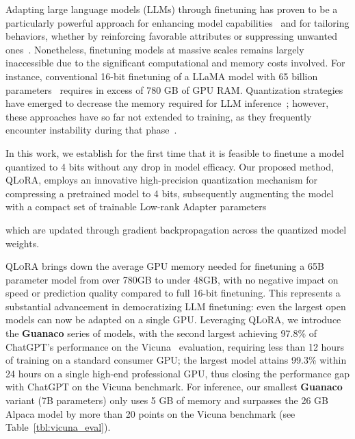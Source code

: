 Adapting large language models (LLMs) through finetuning has proven to be a particularly powerful approach for enhancing model capabilities~\citep{min2021metaicl, wei2021finetuned, ouyang2022training, wang2022super, wang2022self, liu2022few} and for tailoring behaviors, whether by reinforcing favorable attributes or suppressing unwanted ones~\citep{ouyang2022training,askell2021general,bai2022training}. Nonetheless, finetuning models at massive scales remains largely inaccessible due to the significant computational and memory costs involved. For instance, conventional 16-bit finetuning of a LLaMA model with 65 billion parameters~\citep{touvron2023llama} requires in excess of 780 GB of GPU RAM. Quantization strategies have emerged to decrease the memory required for LLM inference~\citep{dettmers2022llm, dettmers2022case, frantar2022gptq, xiao2022smoothquant}; however, these approaches have so far not extended to training, as they frequently encounter instability during that phase~\citep{wortsman2023stable}.

In this work, we establish for the first time that it is feasible to finetune a model quantized to 4 bits without any drop in model efficacy. Our proposed method, \textsc{QLoRA}, employs an innovative high-precision quantization mechanism for compressing a pretrained model to 4 bits, subsequently augmenting the model with a compact set of trainable Low-rank Adapter parameters~\citep{hu2021lora} 

which are updated through gradient backpropagation across the quantized model weights. 

\textsc{QLoRA} brings down the average GPU memory needed for finetuning a 65B parameter model from over 780GB to under 48GB, with no negative impact on speed or prediction quality compared to full 16-bit finetuning. This represents a substantial advancement in democratizing LLM finetuning: even the largest open models can now be adapted on a single GPU. Leveraging \textsc{QLoRA}, we introduce the \textbf{Guanaco} series of models, with the second largest achieving 97.8\% of ChatGPT’s performance on the Vicuna~\citep{vicuna2023} evaluation, requiring less than 12 hours of training on a standard consumer GPU; the largest model attains 99.3\% within 24 hours on a single high-end professional GPU, thus closing the performance gap with ChatGPT on the Vicuna benchmark. For inference, our smallest \textbf{Guanaco} variant (7B parameters) only uses 5 GB of memory and surpasses the 26 GB Alpaca model by more than 20 points on the Vicuna benchmark (see Table~\ref{tbl:vicuna_eval}).

